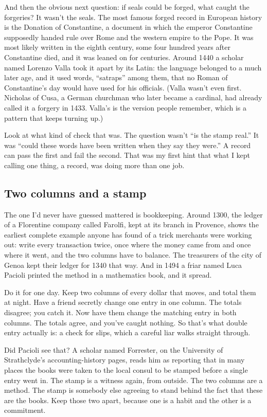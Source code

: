 \documentclass[11pt,twoside]{article}
\theoremstyle{thielethm}
\theoremstyle{thieledef}
\theoremstyle{thieledef}
\theoremstyle{thieledef}
\theoremstyle{thielethm}
\theoremstyle{thieleobs}
\theoremstyle{thielethm}
\begin{document}
And then the obvious next question: if seals could be forged, what caught the forgeries? It wasn't the seals. The most famous forged record in European history is the Donation of Constantine, a document in which the emperor Constantine supposedly handed rule over Rome and the western empire to the Pope. It was most likely written in the eighth century, some four hundred years after Constantine died, and it was leaned on for centuries. Around 1440 a scholar named Lorenzo Valla took it apart by its Latin: the language belonged to a much later age, and it used words, ``satraps'' among them, that no Roman of Constantine's day would have used for his officials. (Valla wasn't even first. Nicholas of Cusa, a German churchman who later became a cardinal, had already called it a forgery in 1433. Valla's is the version people remember, which is a pattern that keeps turning up.)

Look at what kind of check that was. The question wasn't ``is the stamp real.'' It was ``could these words have been written when they say they were.'' A record can pass the first and fail the second. That was my first hint that what I kept calling one thing, a record, was doing more than one job.

\subsection{Two columns and a stamp}

The one I'd never have guessed mattered is bookkeeping. Around 1300, the ledger of a Florentine company called Farolfi, kept at its branch in Provence, shows the earliest complete example anyone has found of a trick merchants were working out: write every transaction twice, once where the money came from and once where it went, and the two columns have to balance. The treasurers of the city of Genoa kept their ledger for 1340 that way. And in 1494 a friar named Luca Pacioli printed the method in a mathematics book, and it spread.

Do it for one day. Keep two columns of every dollar that moves, and total them at night. Have a friend secretly change one entry in one column. The totals disagree; you catch it. Now have them change the matching entry in both columns. The totals agree, and you've caught nothing. So that's what double entry actually is: a check for slips, which a careful liar walks straight through.

Did Pacioli see that? A scholar named Forrester, on the University of Strathclyde's accounting-history pages, reads him as reporting that in many places the books were taken to the local consul to be stamped before a single entry went in. The stamp is a witness again, from outside. The two columns are a method. The stamp is somebody else agreeing to stand behind the fact that these are the books. Keep those two apart, because one is a habit and the other is a commitment.
\end{document}
